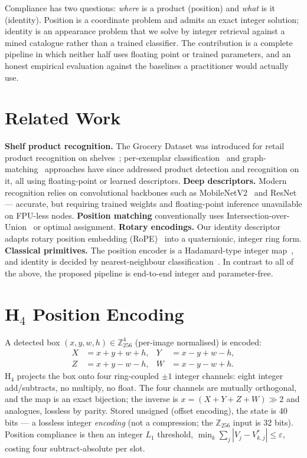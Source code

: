 \documentclass[10pt,journal,compsoc]{IEEEtran}
\begin{document}
Compliance has two questions: \emph{where} is a product (position) and \emph{what}
is it (identity). Position is a coordinate problem and admits an exact integer
solution; identity is an appearance problem that we solve by integer retrieval
against a mined catalogue rather than a trained classifier. The contribution is a
complete pipeline in which neither half uses floating point or trained parameters,
and an honest empirical evaluation against the baselines a practitioner would
actually use.

\section{Related Work}
\textbf{Shelf product recognition.} The Grocery Dataset was introduced for retail
product recognition on shelves~\cite{varol2015}; per-exemplar classification~\cite{george2014}
and graph-matching~\cite{tonioni2017} approaches have since addressed product detection
and recognition on it, all using floating-point or learned descriptors.
\textbf{Deep descriptors.} Modern recognition relies on convolutional backbones such as
MobileNetV2~\cite{sandler2018} and ResNet~\cite{he2016} --- accurate, but requiring trained
weights and floating-point inference unavailable on FPU-less nodes.
\textbf{Position matching} conventionally uses Intersection-over-Union~\cite{everingham2010}
or optimal assignment. \textbf{Rotary encodings.} Our identity descriptor adapts rotary
position embedding (RoPE)~\cite{su2024} into a quaternionic, integer ring form.
\textbf{Classical primitives.} The position encoder is a Hadamard-type integer
map~\cite{pratt1969}, and identity is decided by nearest-neighbour
classification~\cite{cover1967}. In contrast to all of the above, the proposed pipeline
is end-to-end integer and parameter-free.

\section{H$_4$ Position Encoding}
A detected box $(x,y,w,h)\in\mathbb{Z}_{256}^4$ (per-image normalised) is encoded:
\begin{align}
X &= x+y+w+h, & Y &= x-y+w-h,\\
Z &= x+y-w-h, & W &= x-y-w+h.
\end{align}
H$_4$ projects the box onto four ring-coupled $\pm1$ integer channels: eight integer
add/subtracts, no multiply, no float. The four channels are mutually orthogonal, and
the map is an exact bijection; the inverse is $x=(X{+}Y{+}Z{+}W)\gg2$ and
analogues, lossless by parity. Stored unsigned (offset encoding), the state is
40 bits --- a lossless integer \emph{encoding} (not a compression; the $\mathbb{Z}_{256}$
input is 32 bits). Position compliance is then an integer $L_1$ threshold,
$\min_k\sum_j|V_j-V^*_{k,j}|\le\varepsilon$, costing four subtract-absolute per slot.
\end{document}
